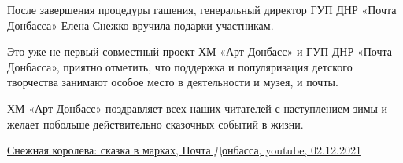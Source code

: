 После завершения процедуры гашения, генеральный директор ГУП ДНР «Почта
Донбасса» Елена Снежко вручила подарки участникам.

Это уже не первый совместный проект ХМ «Арт-Донбасс» и ГУП ДНР «Почта
Донбасса», приятно отметить, что поддержка и популяризация детского творчества
занимают особое место в деятельности и музея, и почты.

ХМ «Арт-Донбасс» поздравляет всех наших читателей с наступлением зимы и желает
побольше действительно сказочных событий в жизни.


\href{https://youtu.be/npAy2WA8mnI}{%
Снежная королева: сказка в марках, Почта Донбасса, youtube, 02.12.2021%
}

